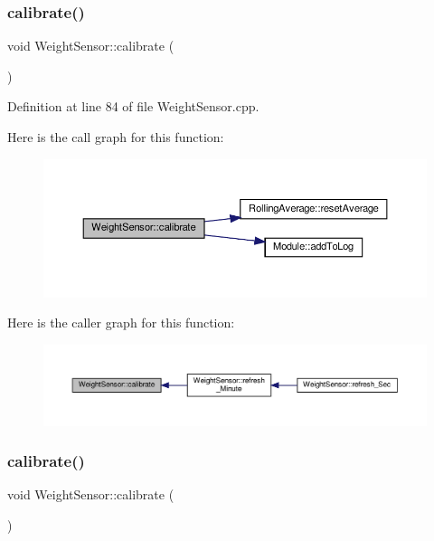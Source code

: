 \subsubsection{\texorpdfstring{calibrate()}{calibrate()}\hspace{0.1cm}{\footnotesize\ttfamily [1/2]}}
{\footnotesize\ttfamily void Weight\+Sensor\+::calibrate (\begin{DoxyParamCaption}{ }\end{DoxyParamCaption})\hspace{0.3cm}{\ttfamily [protected]}}



Definition at line 84 of file Weight\+Sensor.\+cpp.

Here is the call graph for this function\+:
\nopagebreak
\begin{figure}[H]
\begin{center}
\leavevmode
\includegraphics[width=350pt]{class_weight_sensor_a7718da9f72a6f354ea19550567d42fbf_cgraph}
\end{center}
\end{figure}
Here is the caller graph for this function\+:
\nopagebreak
\begin{figure}[H]
\begin{center}
\leavevmode
\includegraphics[width=350pt]{class_weight_sensor_a7718da9f72a6f354ea19550567d42fbf_icgraph}
\end{center}
\end{figure}
\mbox{\label{class_weight_sensor_a7718da9f72a6f354ea19550567d42fbf}} 
\subsubsection{\texorpdfstring{calibrate()}{calibrate()}\hspace{0.1cm}{\footnotesize\ttfamily [2/2]}}
{\footnotesize\ttfamily void Weight\+Sensor\+::calibrate (\begin{DoxyParamCaption}{ }\end{DoxyParamCaption})\hspace{0.3cm}{\ttfamily [protected]}}


